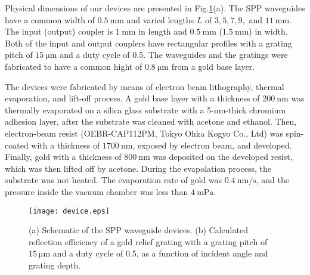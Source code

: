 \documentclass[aip,apl,reprint]{revtex4-1}
\begin{document}
Physical dimensions of our devices are presented in Fig.\ref{fig:device}(a).  The SPP waveguides have a common width of $0.5\:\mathrm{mm}$ and varied lengths $L$ of $3, 5, 7, 9,$ and $11\:\mathrm{mm}$. The input (output) coupler is $1\:\mathrm{mm}$ in length and $0.5\:\mathrm{mm}$ ($1.5\:\mathrm{mm}$) in width. Both of the input and output couplers have rectangular profiles with a grating pitch of $15\:\mathrm{\mu m}$ and a duty cycle of 0.5. The waveguides and the gratings were fabricated to have a common hight of $0.8\:\mathrm{\mu m}$ from a gold base layer.

The devices were fabricated by means of electron beam lithography, thermal evaporation, and lift-off process. A gold base layer with a thickness of $200\:\mathrm{nm}$ was thermally evaporated on a silica glass substrate with a 5-nm-thick chromium adhesion layer, after the substrate was cleaned with acetone and ethanol. Then, electron-beam resist (OEBR-CAP112PM, Tokyo Ohka Kogyo Co., Ltd) was spin-coated with a thickness of $1700\:\mathrm{nm}$, exposed by electron beam, and developed. Finally, gold with a thickness of $800\:\mathrm{nm}$ was deposited on the developed resist, which was then lifted off by acetone. During the evapolation process, the substrate was not heated. The evaporation rate of gold was $0.4\:\mathrm{nm/s}$, and the pressure inside the vacuum chamber was less than $4\:\mathrm{mPa}$.

 \begin{figure}
    \texttt{[image: device.eps]}
    \caption{(a) Schematic of the SPP waveguide devices. (b) Calculated reflection efficiency of a gold relief grating with a grating pitch of $15\:\mathrm{\mu m}$ and a duty cycle of 0.5, as a function of incident angle and grating depth.}
     \label{fig:device}
\end{figure}
\end{document}
